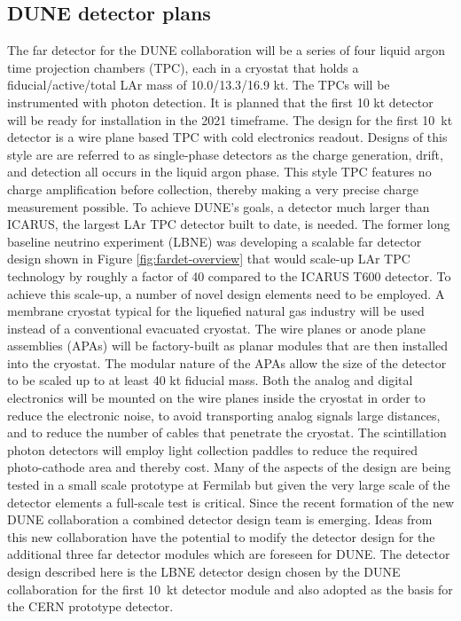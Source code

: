 \label{singlephasedet}

\subsection{DUNE detector plans}

The far detector for the DUNE collaboration will be a series of four liquid argon time projection chambers (TPC), each in a cryostat that holds a fiducial/active/total LAr mass of 10.0/13.3/16.9 kt. The TPCs will be instrumented with photon detection. It is planned that the first 10 kt detector will be ready for installation in the 2021 timeframe. 
The design for the first 10~kt detector is a wire plane based TPC with cold electronics readout. Designs of this style are are referred to as single-phase detectors as the charge generation, drift, and detection all occurs in the liquid argon phase. 
This style TPC features no charge amplification before collection, thereby making a very precise charge measurement possible. 
To achieve DUNE's goals, a detector much larger than ICARUS, the largest LAr TPC detector built to date, is needed. The former long baseline neutrino experiment (LBNE) was developing a scalable far detector design shown in Figure \ref{fig:fardet-overview} that would scale-up LAr TPC technology by roughly a factor of 40 compared to the ICARUS T600 detector. To achieve this scale-up, a number of novel design elements need to be employed. A membrane cryostat typical for the liquefied natural gas industry will be used instead of a conventional evacuated cryostat. The wire planes or anode plane assemblies (APAs) will be factory-built as planar modules that are then installed into the cryostat. The modular nature of the APAs allow the size of the detector to be scaled up to at least 40 kt fiducial mass. Both the analog and digital electronics will be mounted on the wire planes inside the cryostat in order to reduce the electronic noise, to avoid transporting analog signals large distances, and to reduce the number of cables that penetrate the cryostat. The scintillation photon detectors will employ light collection paddles to reduce the required photo-cathode area and thereby cost. 
Many of the aspects of the design are being tested in a small scale prototype at Fermilab but given the very large scale of the detector elements a full-scale test is critical. 
Since the recent formation of the new DUNE collaboration a combined detector design team is emerging. 
Ideas from this new collaboration have the potential to modify the detector design for the additional three far detector modules
which are foreseen for DUNE.
The detector design described here is the LBNE detector design chosen by the DUNE collaboration for the first 10~kt 
detector module and also adopted as the basis for the CERN prototype detector.


